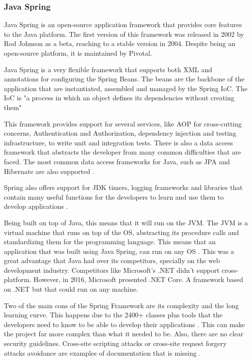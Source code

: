 \subsubsection{Java Spring}
\label{sub:StateOfTheArt_Frameworks_java}
Java Spring is an open-source application framework that provides core features to the Java platform. The first version of this framework was released in 2002 by Rod Johnson as a beta, reaching to a stable version in 2004. Despite being an open-source platform, it is maintained by Pivotal.

\par

Java Spring is a very flexible framework that supports both \gls{XML} and annotations for configuring the Spring Beans. The beans are the backbone of the application that are instantiated, assembled and managed by the Spring \gls{IoC}. The \gls{IoC} is "a process in which an object defines its dependencies without creating them" \parencite{whatIsASpringBean}

\par
This framework provides support for several services, like \gls{AOP} for cross-cutting concerns, Authentication and Authorization, dependency injection and testing infrastructure, to write unit and integration tests. There is also a data access framework that abstracts the developer from many common difficulties that are faced. The most common data access frameworks for Java, such as \gls{JPA} and Hibernate are also supported \parencite{springFramework}. 
\par

Spring also offers support for \gls{JDK} timers, logging frameworks and libraries that contain many useful functions for the developers to learn and use them to develop applications \parencite{prosAndConsJavaSpring}. 

\par
Being built on top of Java, this means that it will run on the \gls{JVM}. The \gls{JVM} is a virtual machine that runs on top of the \gls{OS}, abstracting its procedure calls and standardizing them for the programming language. This means that an application that was built using Java Spring, can run on any \gls{OS} \parencite{whatIsTheJVM}. This was a great advantage that Java had over its competitors, specially on the web development industry. Competitors like Microsoft's .NET didn't support cross-platform. However, in 2016, Microsoft presented .NET Core. A framework based on .NET but that could run on any machine. 
\par 
Two of the main cons of the Spring Framework are its complexity and the long learning curve. This happens due to the 2400+ classes plus tools that the developers need to know to be able to develop their applications \parencite{javaSpringAdvantagesAndDisadvantages}. This can make the project far more complex than what it needed to be. Also, there are no clear security guidelines. Cross-site scripting attacks or cross-site request forgery attacks avoidance are examples of documentation that is missing \parencite{prosAndConsJavaSpring}.

